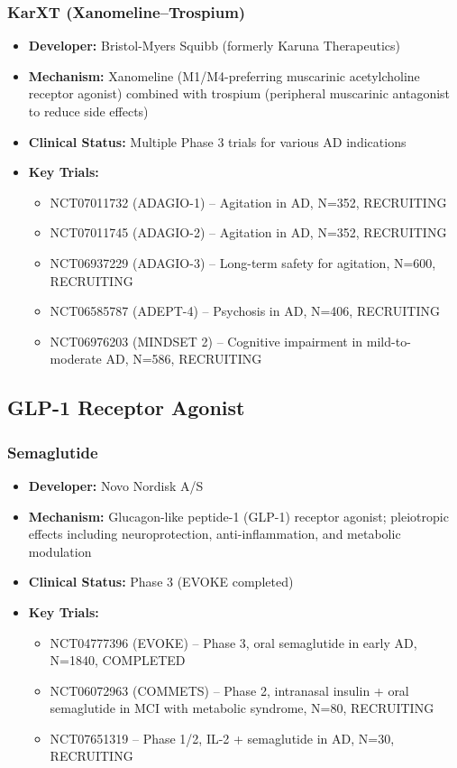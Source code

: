 \documentclass[11pt, a4paper]{article}
\begin{document}
\subsubsection{KarXT (Xanomeline--Trospium)}
\begin{itemize}
    \item \textbf{Developer:} Bristol-Myers Squibb (formerly Karuna Therapeutics)
    \item \textbf{Mechanism:} Xanomeline (M1/M4-preferring muscarinic acetylcholine receptor agonist) combined with trospium (peripheral muscarinic antagonist to reduce side effects)
    \item \textbf{Clinical Status:} Multiple Phase 3 trials for various AD indications
    \item \textbf{Key Trials:}
    \begin{itemize}
        \item NCT07011732 (ADAGIO-1) -- Agitation in AD, N=352, RECRUITING
        \item NCT07011745 (ADAGIO-2) -- Agitation in AD, N=352, RECRUITING
        \item NCT06937229 (ADAGIO-3) -- Long-term safety for agitation, N=600, RECRUITING
        \item NCT06585787 (ADEPT-4) -- Psychosis in AD, N=406, RECRUITING
        \item NCT06976203 (MINDSET 2) -- Cognitive impairment in mild-to-moderate AD, N=586, RECRUITING
    \end{itemize}
\end{itemize}

\subsection{GLP-1 Receptor Agonist}

\subsubsection{Semaglutide}
\begin{itemize}
    \item \textbf{Developer:} Novo Nordisk A/S
    \item \textbf{Mechanism:} Glucagon-like peptide-1 (GLP-1) receptor agonist; pleiotropic effects including neuroprotection, anti-inflammation, and metabolic modulation
    \item \textbf{Clinical Status:} Phase 3 (EVOKE completed)
    \item \textbf{Key Trials:}
    \begin{itemize}
        \item NCT04777396 (EVOKE) -- Phase 3, oral semaglutide in early AD, N=1840, COMPLETED
        \item NCT06072963 (COMMETS) -- Phase 2, intranasal insulin + oral semaglutide in MCI with metabolic syndrome, N=80, RECRUITING
        \item NCT07651319 -- Phase 1/2, IL-2 + semaglutide in AD, N=30, RECRUITING
    \end{itemize}
\end{itemize}
\end{document}
